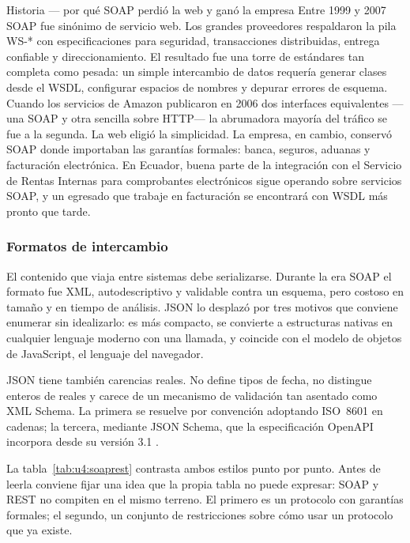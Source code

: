\documentclass[11pt,a4paper,openany]{book}
\begin{document}
\begin{cajahistoria}{Historia --- por qué SOAP perdió la web y ganó la empresa}
	Entre 1999 y 2007 SOAP fue sinónimo de servicio web. Los grandes proveedores respaldaron la pila WS-* con especificaciones para seguridad, transacciones distribuidas, entrega confiable y direccionamiento. El resultado fue una torre de estándares tan completa como pesada: un simple intercambio de datos requería generar clases desde el WSDL, configurar espacios de nombres y depurar errores de esquema. Cuando los servicios de Amazon publicaron en 2006 dos interfaces equivalentes ---una SOAP y otra sencilla sobre HTTP--- la abrumadora mayoría del tráfico se fue a la segunda. La web eligió la simplicidad. La empresa, en cambio, conservó SOAP donde importaban las garantías formales: banca, seguros, aduanas y facturación electrónica. En Ecuador, buena parte de la integración con el Servicio de Rentas Internas para comprobantes electrónicos sigue operando sobre servicios SOAP, y un egresado que trabaje en facturación se encontrará con WSDL más pronto que tarde.
\end{cajahistoria}

\subsubsection{Formatos de intercambio}

El contenido que viaja entre sistemas debe serializarse. Durante la era SOAP el formato fue XML, autodescriptivo y validable contra un esquema, pero costoso en tamaño y en tiempo de análisis. JSON lo desplazó por tres motivos que conviene enumerar sin idealizarlo: es más compacto, se convierte a estructuras nativas en cualquier lenguaje moderno con una llamada, y coincide con el modelo de objetos de JavaScript, el lenguaje del navegador.

JSON tiene también carencias reales. No define tipos de fecha, no distingue enteros de reales y carece de un mecanismo de validación tan asentado como XML Schema. La primera se resuelve por convención adoptando ISO~8601 en cadenas; la tercera, mediante JSON Schema, que la especificación OpenAPI incorpora desde su versión 3.1 \cite{oai2025oas32}.

La tabla~\ref{tab:u4:soaprest} contrasta ambos estilos punto por punto. Antes de leerla conviene fijar una idea que la propia tabla no puede expresar: SOAP y REST no compiten en el mismo terreno. El primero es un protocolo con garantías formales; el segundo, un conjunto de restricciones sobre cómo usar un protocolo que ya existe.
\end{document}
